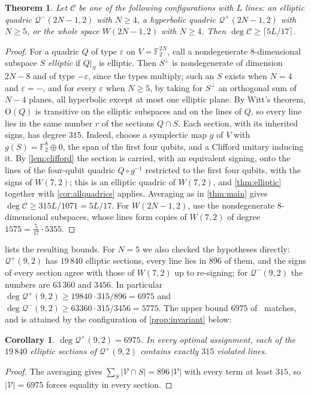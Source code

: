 \documentclass[11pt]{article}
\newtheorem{theorem}{Theorem}
\newtheorem{corollary}[corollary]{Corollary}
\theoremstyle{definition}
\theoremstyle{remark}
\newcommand{\F}{\mathbb{F}}
\newcommand{\Qp}{\mathcal{Q}^{+}}
\newcommand{\Qm}{\mathcal{Q}^{-}}
\newcommand{\dg}{\operatorname{deg}}
\newcommand{\GO}{\mathrm{O}}
\begin{document}
\begin{theorem}\label{thm:ratio}
Let $\mathcal C$ be one of the following configurations with $L$ lines: an elliptic quadric $\Qm(2N-1,2)$ with $N\ge4$, a hyperbolic quadric $\Qp(2N-1,2)$ with $N\ge5$, or the whole space $W(2N-1,2)$ with $N\ge4$. Then $\dg\mathcal C\ge\lceil 5L/17\rceil$.
\end{theorem}
\begin{proof}
For a quadric $Q$ of type $\varepsilon$ on $V=\F_2^{2N}$, call a nondegenerate $8$-dimensional subspace $S$ \emph{elliptic} if $Q|_S$ is elliptic.
Then $S^\perp$ is nondegenerate of dimension $2N-8$ and of type $-\varepsilon$, since the types multiply; such an $S$ exists when $N=4$ and $\varepsilon=-$, and for every $\varepsilon$ when $N\ge5$, by taking for $S^\perp$ an orthogonal sum of $N-4$ planes, all hyperbolic except at most one elliptic plane.
By Witt's theorem, $\GO(Q)$ is transitive on the elliptic subspaces and on the lines of $Q$, so every line lies in the same number $r$ of the sections $Q\cap S$.
Each section, with its inherited signs, has degree $315$.
Indeed, choose a symplectic map $g$ of $V$ with $g(S)=\F_2^8\oplus0$, the span of the first four qubits, and a Clifford unitary inducing it.
By \cref{lem:clifford} the section is carried, with an equivalent signing, onto the lines of the four-qubit quadric $Q\circ g^{-1}$ restricted to the first four qubits, with the signs of $W(7,2)$; this is an elliptic quadric of $W(7,2)$, and \cref{thm:elliptic} together with \cref{cor:allquadrics} applies.
Averaging as in \cref{thm:main} gives $\dg\mathcal C\ge 315L/1071=5L/17$.
For $W(2N-1,2)$, use the nondegenerate $8$-dimensional subspaces, whose lines form copies of $W(7,2)$ of degree $1575=\tfrac5{17}\cdot5355$.
\end{proof}

 lists the resulting bounds.
For $N=5$ we also checked the hypotheses directly: $\Qp(9,2)$ has $19\,840$ elliptic sections, every line lies in $896$ of them, and the signs of every section agree with those of $W(7,2)$ up to re-signing; for $\Qm(9,2)$ the numbers are $63\,360$ and $3456$.
In particular $\dg\Qp(9,2)\ge19840\cdot315/896=6975$ and $\dg\Qm(9,2)\ge63360\cdot315/3456=5775$.
The upper bound $6975$ of~\cite{Muller24} matches, and is attained by the configuration of \cref{prop:invariant} below:

\begin{corollary}\label{cor:fivequbit}
$\dg\Qp(9,2)=6975$. In every optimal assignment, each of the $19\,840$ elliptic sections of $\Qp(9,2)$ contains exactly $315$ violated lines.
\end{corollary}
\begin{proof}
The averaging gives $\sum_S|\mathcal V\cap S|=896\,|\mathcal V|$ with every term at least $315$, so $|\mathcal V|=6975$ forces equality in every section.
\end{proof}
\end{document}
